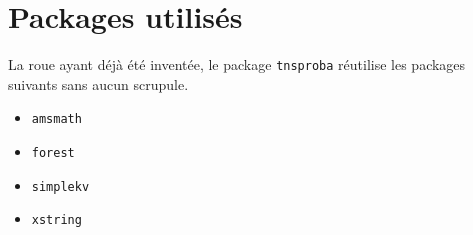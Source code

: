 \documentclass[12pt,a4paper]{article}
\begin{document}
\section{Packages utilisés}

La roue ayant déjà été inventée, le package \verb#tnsproba# réutilise les packages suivants sans aucun scrupule.

\begin{multicols}{4}
    \begin{itemize}
        \item \verb#amsmath#
        \item \verb#forest#
        \item \verb#simplekv#
        \item \verb#xstring#
    \end{itemize}
\end{multicols}
\end{document}
